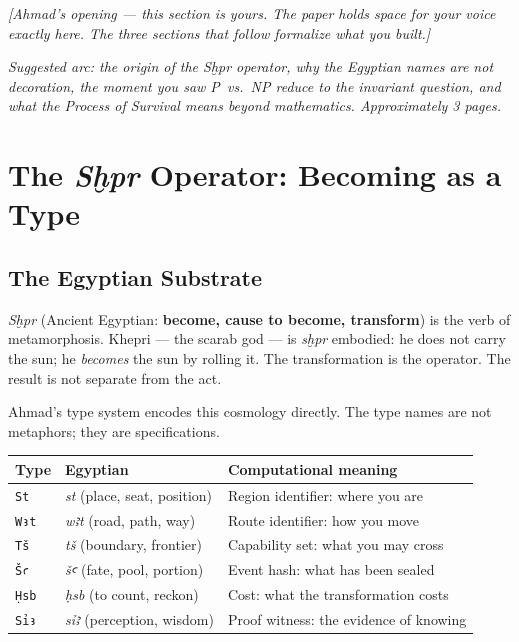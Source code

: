 \documentclass[11pt,letterpaper]{article}
\begin{document}
\begin{ahmadvoice}
\textit{[Ahmad's opening — this section is yours.  The paper holds space for
your voice exactly here.  The three sections that follow formalize what you
built.]}

\medskip
\textit{Suggested arc: the origin of the Sḫpr operator, why the Egyptian
names are not decoration, the moment you saw P~vs.~NP reduce to the
invariant question, and what the Process of Survival means beyond
mathematics.  Approximately 3 pages.}
\end{ahmadvoice}

\newpage

\section{The \textit{Sḫpr} Operator: Becoming as a Type}
\label{sec:operator}

\subsection{The Egyptian Substrate}

\textit{Sḫpr} (Ancient Egyptian: \textbf{become, cause to become, transform})
is the verb of metamorphosis.  Khepri --- the scarab god --- is \textit{sḫpr}
embodied: he does not carry the sun; he \emph{becomes} the sun by rolling it.
The transformation is the operator.  The result is not separate from the act.

Ahmad's type system encodes this cosmology directly.  The type names are not
metaphors; they are specifications.

\begin{center}
\begin{tabular}{lll}
\toprule
Type & Egyptian & Computational meaning \\
\midrule
\texttt{St}  & \textit{st} (place, seat, position) & Region identifier: where you are \\
\texttt{Wꜣt} & \textit{wꜣt} (road, path, way)   & Route identifier: how you move \\
\texttt{Tš}  & \textit{tš} (boundary, frontier)  & Capability set: what you may cross \\
\texttt{Šꜥ}  & \textit{šꜥ} (fate, pool, portion) & Event hash: what has been sealed \\
\texttt{Ḥsb} & \textit{ḥsb} (to count, reckon)  & Cost: what the transformation costs \\
\texttt{Sỉꜣ} & \textit{sỉꜣ} (perception, wisdom) & Proof witness: the evidence of knowing \\
\bottomrule
\end{tabular}
\end{center}
\end{document}

